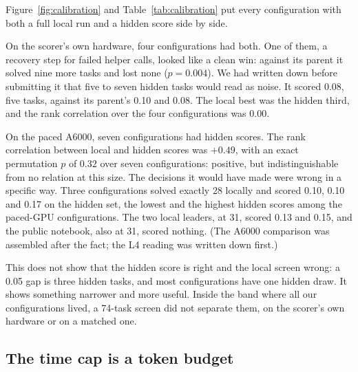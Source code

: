 \documentclass[11pt]{article}
\begin{document}
Figure~\ref{fig:calibration} and Table~\ref{tab:calibration} put every configuration with both a full local run and a
hidden score side by side.

On the scorer's own hardware, four configurations had both. One of them, a recovery step for failed helper calls, looked like
a clean win: against its parent it solved nine more tasks and lost none ($p=0.004$). We had written down before submitting it
that five to seven hidden tasks would read as noise. It scored 0.08, five tasks, against its parent's 0.10 and 0.08. The
local best was the hidden third, and the rank correlation over the four configurations was 0.00.

On the paced A6000, seven configurations had hidden scores. The rank correlation between local and hidden scores was $+0.49$,
with an exact permutation $p$ of $0.32$ over seven configurations: positive, but indistinguishable from no relation at this
size. The decisions it would have made were wrong in a specific way. Three configurations solved exactly 28 locally and
scored 0.10, 0.10 and 0.17 on the hidden set, the lowest and the highest hidden scores among the paced-GPU configurations. The two local leaders, at 31,
scored 0.13 and 0.15, and the public notebook, also at 31, scored nothing. (The A6000 comparison was assembled after the
fact; the L4 reading was written down first.)

This does not show that the hidden score is right and the local screen wrong: a 0.05 gap is three hidden tasks, and most
configurations have one hidden draw. It shows something narrower and more useful. Inside the band where all our
configurations lived, a 74-task screen did not separate them, on the scorer's own hardware or on a matched one.

\begin{table}[t]
\centering\small

\vspace{6pt}


\caption{Local solves and hidden public scores. Top: Kaggle's 4xL4 notebooks (scorer hardware). Bottom: the paced A6000,
sorted by local solves. Configurations with two numbers were run or submitted twice.}
\label{tab:calibration}
\end{table}

\subsection{The time cap is a token budget}
\label{sec:budget}
\end{document}
